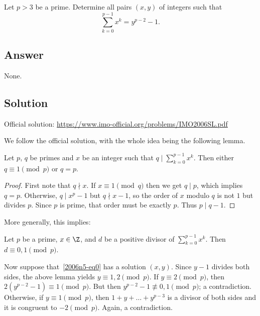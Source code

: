 Let $p > 3$ be a prime.
Determine all pairs $(x, y)$ of integers such that
\[ \sum_{k = 0}^{p - 1} x^k = y^{p - 2} - 1. \tag{*}\label{2006n5-eq0} \]



\subsection*{Answer}

None.



\subsection*{Solution}

Official solution: \url{https://www.imo-official.org/problems/IMO2006SL.pdf}

We follow the official solution, with the whole idea being the following lemma.

\begin{lemma}\label{2006n5-1}
Let $p$, $q$ be primes and $x$ be an integer such that $q \mid \sum_{k = 0}^{p - 1} x^k$.
Then either $q \equiv 1 \pmod{p}$ or $q = p$.
\end{lemma}
\begin{proof}
First note that $q \nmid x$.
If $x \equiv 1 \pmod{q}$ then we get $q \mid p$, which implies $q = p$.
Otherwise, $q \mid x^p - 1$ but $q \nmid x - 1$, so the order of $x$ modulo $q$ is not $1$ but divides $p$.
Since $p$ is prime, that order must be exactly $p$.
Thus $p \mid q - 1$.
\end{proof}

More generally, this implies:

\begin{lemma}\label{2006n5-2}
Let $p$ be a prime, $x \in \Z$, and $d$ be a positive divisor of $\sum_{k = 0}^{p - 1} x^k$.
Then $d \equiv 0, 1 \pmod{p}$.
\end{lemma}

Now suppose that~\eqref{2006n5-eq0} has a solution $(x, y)$.
Since $y - 1$ divides both sides, the above lemma yields $y \equiv 1, 2 \pmod{p}$.
If $y \equiv 2 \pmod{p}$, then $2(y^{p - 2} - 1) \equiv 1 \pmod{p}$.
But then $y^{p - 2} - 1 \not\equiv 0, 1 \pmod{p}$; a contradiction.
Otherwise, if $y \equiv 1 \pmod{p}$, then $1 + y + \ldots + y^{p - 3}$ is a divisor of both sides and it is congruent to $-2 \pmod{p}$.
Again, a contradiction.
